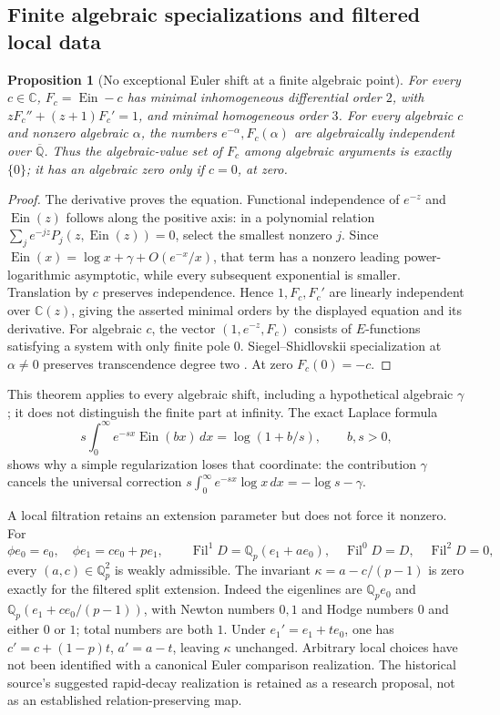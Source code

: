 \documentclass[11pt,a4paper]{article}
\newcommand{\Q}{\mathbb Q}
\newcommand{\C}{\mathbb C}
\newcommand{\Qbar}{\overline{\mathbb Q}}
\newcommand{\Ein}{\operatorname{Ein}}
\newtheorem{proposition}[theorem]{Proposition}
\theoremstyle{definition}
\theoremstyle{remark}
\numberwithin{equation}{section}
\begin{document}
\subsection{Finite algebraic specializations and filtered local data}
\begin{proposition}[No exceptional Euler shift at a finite algebraic point]
\label{ar:Einshift}
For every $c\in\C$, $F_c=\Ein-c$ has minimal inhomogeneous differential
order $2$, with $zF_c''+(z+1)F_c'=1$, and minimal homogeneous order $3$.
For every algebraic $c$ and nonzero algebraic $\alpha$, the numbers
$e^{-\alpha},F_c(\alpha)$ are algebraically independent over $\Qbar$.
Thus the algebraic-value set of $F_c$ among algebraic arguments is exactly
$\{0\}$; it has an algebraic zero only if $c=0$, at zero.
\end{proposition}
\begin{proof}
The derivative proves the equation.  Functional independence of $e^{-z}$
and $\Ein(z)$ follows along the positive axis: in a polynomial relation
$\sum_je^{-jz}P_j(z,\Ein(z))=0$, select the smallest nonzero $j$.
Since $\Ein(x)=\log x+\gamma+O(e^{-x}/x)$, that term has a nonzero
leading power-logarithmic asymptotic, while every subsequent exponential
is smaller.  Translation by $c$ preserves independence.  Hence
$1,F_c,F_c'$ are linearly independent over $\C(z)$, giving the asserted
minimal orders by the displayed equation and its derivative.
For algebraic $c$, the vector $(1,e^{-z},F_c)$ consists of $E$-functions
satisfying a system with only finite pole $0$.  Siegel--Shidlovskii
specialization at $\alpha\ne0$ preserves transcendence degree two
\cite{pm:Beukers2006}.  At zero $F_c(0)=-c$.
\end{proof}
This theorem applies to every algebraic shift, including a hypothetical
algebraic $\gamma$; it does not distinguish the finite part at infinity.
The exact Laplace formula
\[
 s\int_0^\infty e^{-sx}\Ein(bx)\,dx=\log(1+b/s),\qquad b,s>0,
\]
shows why a simple regularization loses that coordinate: the contribution
$\gamma$ cancels the universal correction
$s\int_0^\infty e^{-sx}\log x\,dx=-\log s-\gamma$.

A local filtration retains an extension parameter but does not force it
nonzero.  For
\[
 \phi e_0=e_0,\quad \phi e_1=ce_0+pe_1,\qquad
 \operatorname{Fil}^1D=\Q_p(e_1+ae_0),\quad
 \operatorname{Fil}^0D=D,\quad \operatorname{Fil}^2D=0,
\]
every $(a,c)\in\Q_p^2$ is weakly admissible.  The invariant
$\kappa=a-c/(p-1)$ is zero exactly for the filtered split extension.
Indeed the eigenlines are $\Q_pe_0$ and
$\Q_p(e_1+c e_0/(p-1))$, with Newton numbers $0,1$ and Hodge numbers
$0$ and either $0$ or $1$; total numbers are both $1$.
Under $e_1'=e_1+te_0$, one has $c'=c+(1-p)t$, $a'=a-t$, leaving
$\kappa$ unchanged.  Arbitrary local choices have not been identified with
a canonical Euler comparison realization.  The historical source's
suggested rapid-decay realization is retained as a research proposal, not
as an established relation-preserving map.
\end{document}
